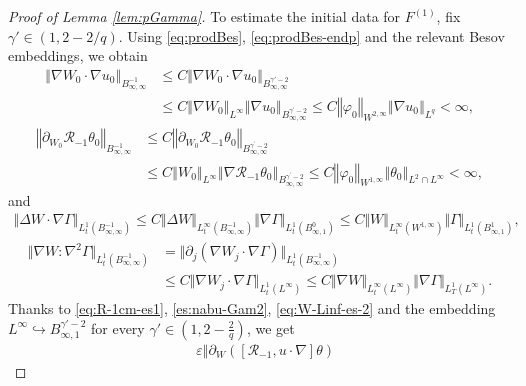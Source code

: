 \documentclass[reqno,11pt,a4paper]{amsart}
\begin{document}
\begin{proof}[Proof of Lemma \ref{lem:pGamma}]

To estimate the initial data for $F^{(1)}$,
fix $\gamma'\in(1,2-2/q)$.
Using \eqref{eq:prodBes}, \eqref{eq:prodBes-endp} 
and the relevant Besov embeddings,
we obtain
\begin{align*}
  \left\Vert \nabla W_0\cdot\nabla u_0\right\Vert _{ B_{\infty, \infty}^{-1}}  
  & \leq C \Vert \nabla W_0\cdot \nabla u_0\Vert _{B^{\gamma'-2}_{\infty,\infty}} \\
  & \leq C \left\Vert \nabla W_0\right\Vert _{L^{\infty}}
  \left\Vert \nabla u_0\right\Vert _{ B_{\infty, \infty}^{\gamma^{\prime}-2}}
  \leq C\left\Vert \varphi_0\right\Vert _{W^{2, \infty}}\left\Vert \nabla u_0\right\Vert _{L^q} <\infty,
\end{align*}
\begin{align*}
  \left\Vert \partial_{W_0} \mathcal{R}_{-1} \theta_0\right\Vert _{B_{\infty,\infty}^{-1}} 
  & \leq C \left\Vert \partial_{W_0} \mathcal{R}_{-1} \theta_0\right\Vert _{B_{\infty, \infty}^{\gamma^{\prime}-2}} \\
  & \leq C \left\Vert W_0\right\Vert _{L^\infty} 
  \left\Vert \nabla \mathcal{R}_{-1} \theta_0\right\Vert _{ B_{\infty, \infty}^{\gamma^{\prime}-2}}
  \leq C \left\Vert \varphi_0\right\Vert _{W^{1, \infty}}\left\Vert \theta_0\right\Vert _{L^2\cap L^\infty} <\infty,
\end{align*}
and
\begin{align*}
  \Vert \Delta W \cdot \nabla \Gamma\Vert _{L^1_t(B^{-1}_{\infty,\infty})}
  \leq C \Vert \Delta W\Vert _{L^\infty_t(B^{-1}_{\infty,\infty})} \Vert \nabla \Gamma\Vert _{L^1_t(B^0_{\infty,1})}
  \leq  C \Vert W\Vert _{L^\infty_t(W^{1,\infty})} \Vert  \Gamma\Vert _{L^1_t(B^1_{\infty,1})},
\end{align*}
\begin{align*}
  \Vert \nabla W:\nabla^2\Gamma\Vert _{L^1_t(B^{-1}_{\infty,\infty})} 
  & = \Vert  \partial_j (\nabla W_j \cdot \nabla\Gamma) \Vert _{L^1_t(B^{-1}_{\infty,\infty})} \\
  & \leq C \Vert \nabla W_j\cdot \nabla \Gamma\Vert _{L^1_t(L^\infty)}
  \leq C \Vert \nabla W\Vert _{L^\infty_t(L^\infty)} \Vert \nabla \Gamma\Vert _{L^1_T(L^\infty)} .
\end{align*}
Thanks to \eqref{eq:R-1cm-es1}, \eqref{es:nabu-Gam2}, \eqref{eq:W-Linf-es-2} 
and the embedding $L^\infty\hookrightarrow B^{\gamma'-2}_{\infty,1}$ for every $\gamma'\in(1,2-\frac{2}{q})$, 
we get
\begin{align*}%
  &\varepsilon\left\Vert \partial_W\left(\left[\mathcal{R}_{-1}, u \cdot \nabla\right] \theta\right)

\end{align*}
\end{proof}
\end{document}

